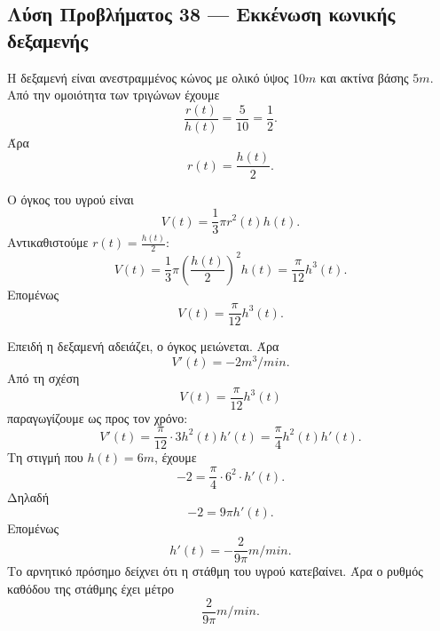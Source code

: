 \subsection*{Λύση Προβλήματος 38 --- Εκκένωση κωνικής δεξαμενής}

\begin{alist}
  \item Η δεξαμενή είναι ανεστραμμένος κώνος με ολικό ύψος
        $10\si{m}$ και ακτίνα βάσης $5\si{m}$. Από την ομοιότητα των
        τριγώνων έχουμε
        \[
          \frac{r(t)}{h(t)}=\frac{5}{10}=\frac12.
        \]
        Άρα
        \[
          {r(t)=\frac{h(t)}{2}}.
        \]

        Ο όγκος του υγρού είναι
        \[
          V(t)=\frac13\pi r^2(t)h(t).
        \]
        Αντικαθιστούμε $r(t)=\frac{h(t)}2$:
        \[
          V(t)
          =
          \frac13\pi
          \left(\frac{h(t)}2\right)^2h(t)
          =
          \frac{\pi}{12}h^3(t).
        \]
        Επομένως
        \[
          {V(t)=\frac{\pi}{12}h^3(t)}.
        \]

  \item Επειδή η δεξαμενή αδειάζει, ο όγκος μειώνεται. Άρα
        \[
          V'(t)=-2\si{m^3/min}.
        \]
        Από τη σχέση
        \[
          V(t)=\frac{\pi}{12}h^3(t)
        \]
        παραγωγίζουμε ως προς τον χρόνο:
        \[
          V'(t)
          =
          \frac{\pi}{12}\cdot3h^2(t)h'(t)
          =
          \frac{\pi}{4}h^2(t)h'(t).
        \]
        Τη στιγμή που $h(t)=6\si{m}$, έχουμε
        \[
          -2
          =
          \frac{\pi}{4}\cdot6^2\cdot h'(t).
        \]
        Δηλαδή
        \[
          -2=9\pi h'(t).
        \]
        Επομένως
        \[
          {h'(t)=-\frac{2}{9\pi}\si{m/min}}.
        \]
        Το αρνητικό πρόσημο δείχνει ότι η στάθμη του υγρού κατεβαίνει.
        Άρα ο ρυθμός καθόδου της στάθμης έχει μέτρο
        \[
          {\frac{2}{9\pi}\si{m/min}}.
        \]
\end{alist}
